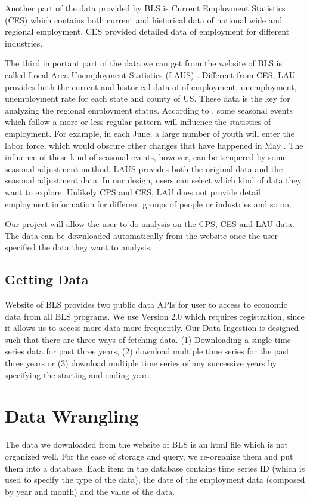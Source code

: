 \documentclass{sigchi}
\begin{document}
Another part of the data provided by BLS is Current Employment Statistics (CES) \cite{CES_data} which contains both current and historical data of national wide and regional employment. CES provided detailed data of employment for different industries.

The third important part of the data we can get from the website of BLS is called Local Area Unemployment Statistics (LAUS) \cite{LAUS_data}. Different from CES, LAU provides both the current and historical data of of employment, unemployment, unemployment rate for each state and county of US. These data is the key for analyzing the regional employment status. According to \cite{report}, some seasonal events which follow a more or less regular pattern will influence the statistics of employment. For example, in each June, a large number of youth will enter the labor force, which would obscure other changes that have happened in May \cite{report}. The influence of these kind of seasonal events, however, can be tempered by some seasonal adjustment method. LAUS provides both the original data and the seasonal adjustment data. In our design, users can select which kind of data they want to explore. Unlikely CPS and CES, LAU does not provide detail employment information for different groups of people or industries and so on.

Our project will allow the user to do analysis on the CPS, CES and LAU data. The data can be downloaded automatically from the website once the user specified the data they want to analysis.

\subsection{Getting Data}
Website of BLS\cite{Labor_data} provides two public data APIs \cite{API} for user to access to economic data from all BLS programs. We use Version 2.0 which requires registration, since it allows us to access more data more frequently. Our Data Ingestion is designed such that there are three ways of fetching data. (1) Downloading a single time series data for past three years, (2) download multiple time series for the past three years or (3) download multiple time series of any successive years by specifying the starting and ending year.

\section{Data Wrangling}
The data we downloaded from the website of BLS is an html file which is not organized well. For the ease of storage and query, we re-organize them and put them into a database. Each item in the database contains time series ID (which is used to specify the type of the data), the date of the employment data (composed by year and month) and the value of the data.
\end{document}
